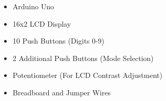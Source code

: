 
\begin{itemize}
\item Arduino Uno
\item 16x2 LCD Display
\item 10 Push Buttons (Digits 0-9)
\item 2 Additional Push Buttons (Mode Selection)
\item Potentiometer (For LCD Contrast Adjustment)
\item Breadboard and Jumper Wires
\end{itemize}